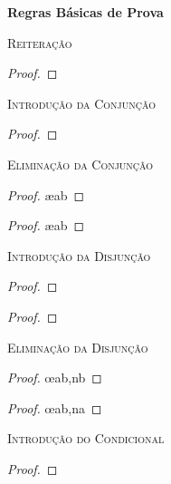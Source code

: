 \label{ProofRules}
{\LARGE \bf Regras Básicas de Prova}

\textsc{Reiteração}

\begin{proof}
	 
\end{proof}


\textsc{Introdução da Conjunção}

\begin{proof}
	 
\end{proof}

\textsc{Eliminação da Conjunção}

\begin{proof}
	 \ae{ab}
\end{proof}

\begin{proof}
	 \ae{ab}
\end{proof}

\textsc{Introdução da Disjunção}

\begin{proof}
\end{proof}

\begin{proof}
\end{proof}

\textsc{Eliminação da Disjunção}

\begin{proof}
	 \oe{ab,nb}
\end{proof}

\begin{proof}
	 \oe{ab,na}
\end{proof}


\textsc{Introdução do Condicional}

\nopagebreak
\begin{proof}
	\open
		 
	\close
\end{proof}

